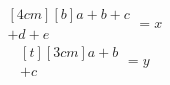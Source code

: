 \documentclass{article}
\newcommand\mypos{t}
\begin{document}
\[ \begin{multlined}[4cm][b] a+b+c \\ +d+e \end{multlined} = x \]
\[ \begin{multlined}[\mypos][3cm] a+b \\ +c \end{multlined} = y \]
\end{document}
